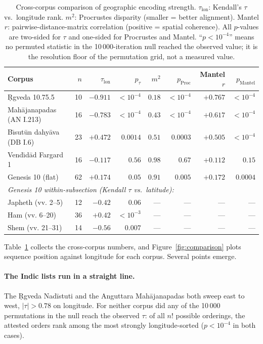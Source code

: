 \documentclass[11pt]{article}
\begin{document}
\begin{table}[t]
\caption{Cross-corpus comparison of geographic encoding strength.
$\tau_\text{lon}$: Kendall's $\tau$ vs.\ longitude rank.
$m^2$: Procrustes disparity (smaller = better alignment).
Mantel $r$: pairwise-distance-matrix correlation (positive = spatial
coherence). All $p$-values are two-sided for $\tau$ and one-sided
for Procrustes and Mantel. ``$p<10^{-4}$'' means no permuted
statistic in the 10\,000-iteration null reached the observed value;
it is the resolution floor of the permutation grid, not a measured
value.}
\label{tab:comparison}
\centering\footnotesize
\setlength{\tabcolsep}{4.5pt}
\begin{tabular}{lrrrrrrr}
\toprule
Corpus & $n$ & $\tau_\text{lon}$ & $p_\tau$ & $m^2$ & $p_\text{Proc}$
       & Mantel $r$ & $p_\text{Mantel}$ \\
\midrule
\d{R}gveda 10.75.5          & 10 & $-0.911$ & $<10^{-4}$ & $0.18$ & $<10^{-4}$ & $+0.767$ & $<10^{-4}$ \\
Mah\={a}janapadas (AN I.213)  & 16 & $-0.783$ & $<10^{-4}$ & $0.43$ & $<10^{-4}$ & $+0.617$ & $<10^{-4}$ \\
B\={\i}sut\={u}n dahy\={a}va (DB I.6) & 23 & $+0.472$ & $0.0014$   & $0.51$ & $0.0003$   & $+0.505$ & $<10^{-4}$ \\
Vend\={\i}d\={a}d Fargard 1      & 16 & $-0.117$ & $0.56$     & $0.98$ & $0.67$     & $+0.112$ & $0.15$ \\
Genesis 10 (flat)             & 62 & $+0.174$ & $0.05$     & $0.91$ & $0.005$    & $+0.172$ & $0.0004$ \\
\midrule
\multicolumn{8}{l}{\textit{Genesis 10 within-subsection (Kendall $\tau$ vs.\ latitude):}}\\
\quad Japheth (vv. 2--5)      & 12 & $-0.42$  & $0.06$     & ---    & ---       & ---      & ---       \\
\quad Ham (vv. 6--20)         & 36 & $+0.42$  & $<10^{-3}$ & ---    & ---       & ---      & ---       \\
\quad Shem (vv. 21--31)       & 14 & $-0.56$  & $0.007$    & ---    & ---       & ---      & ---       \\
\bottomrule
\end{tabular}
\end{table}

Table~\ref{tab:comparison} collects the cross-corpus numbers, and
Figure~\ref{fig:comparison} plots sequence position against
longitude for each corpus. Several points emerge.

\paragraph{The Indic lists run in a straight line.}
The Ṛgveda Nadīstuti and the Anguttara Mahājanapadas both sweep
east to west, $|\tau| > 0.78$ on longitude. For neither corpus did
any of the 10\,000 permutations in the null reach the observed
$\tau$: of all $n!$ possible orderings, the attested orders rank
among the most strongly longitude-sorted ($p < 10^{-4}$ in both
cases).
\end{document}
